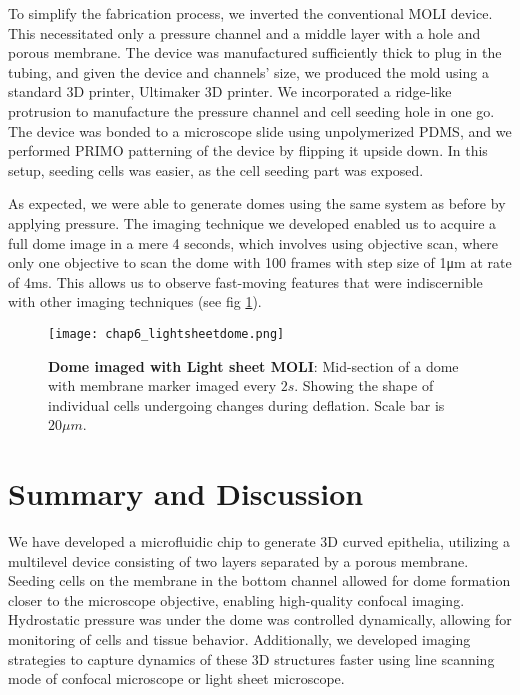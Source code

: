 To simplify the fabrication process, we inverted the conventional MOLI device. This necessitated only a pressure channel and a middle layer with a hole and porous membrane. The device was manufactured sufficiently thick to plug in the tubing, and given the device and channels' size, we produced the mold using a standard 3D printer, Ultimaker 3D printer. We incorporated a ridge-like protrusion to manufacture the pressure channel and cell seeding hole in one go. The device was bonded to a microscope slide using unpolymerized PDMS, and we performed PRIMO patterning of the device by flipping it upside down. In this setup, seeding cells was easier, as the cell seeding part was exposed.

As expected, we were able to generate domes using the same system as before by applying pressure. The imaging technique we developed enabled us to acquire a full dome image in a mere 4 seconds, which involves using objective scan, where only one objective to scan the dome with 100 frames with step size of 1\unit{\um} at rate of 4\unit{\ms}. This allows us to observe fast-moving features that were indiscernible with other imaging techniques (see fig \ref{fig_6_9}).

\begin{figure}[]
	\centering
	\texttt{[image: chap6\_lightsheetdome.png]}
	\caption{ \textbf{Dome imaged with Light sheet MOLI}: Mid-section of a dome with membrane marker imaged every $2s$. Showing the shape of individual cells undergoing changes during deflation. Scale bar is $20 \mu m$.
	}\label{fig_6_9}
\end{figure}


\clearpage

\hypertarget{summary-and-discussion}{%
\section{Summary and Discussion}\label{summary-and-discussion}}

We have developed a microfluidic chip to generate 3D curved epithelia, utilizing a multilevel device consisting of two layers separated by a porous membrane. Seeding cells on the membrane in the bottom channel allowed for dome formation closer to the microscope objective, enabling high-quality confocal imaging. Hydrostatic pressure was under the dome was controlled dynamically, allowing for monitoring of cells and tissue behavior. Additionally, we developed imaging strategies to capture dynamics of these 3D structures faster using line scanning mode of confocal microscope or light sheet microscope.

